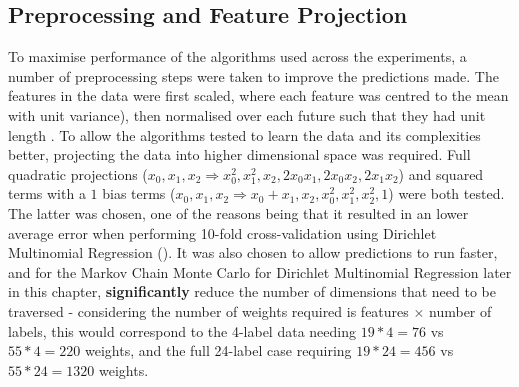\subsection{Preprocessing and Feature Projection}
To maximise performance of the algorithms used across the experiments, a number of preprocessing steps were taken to improve the predictions made. The features in the data were first scaled, where each feature was centred to the mean with unit variance), then normalised over each future such that they had unit length . To allow the algorithms tested to learn the data and its complexities better, projecting the data into higher dimensional space was required. Full quadratic projections ($x_0, x_1, x_2 \Rightarrow x_0^2 ,x_1^2 ,x_2 ,2x_0x_1 ,2x_0x_2 ,2x_1x_2$) and squared terms with a $1$ bias terms ($x_0, x_1, x_2 \Rightarrow x_0 + x_1 , x_2 ,x_0^2 ,x_1^2, x_2^2, 1$) were both tested. The latter was chosen, one of the reasons being that it resulted in an lower average error when performing 10-fold cross-validation using Dirichlet Multinomial Regression (). It was also chosen to allow predictions to run faster, and for the Markov Chain Monte Carlo for Dirichlet Multinomial Regression later in this chapter, \textbf{significantly} reduce the number of dimensions that need to be traversed - considering the number of weights required is features $\times$ number of labels, this would correspond to the 4-label data needing $19*4=76$ vs $55*4=220$ weights, and the full 24-label case requiring $19*24=456$ vs $55*24=1320$ weights.



% 


